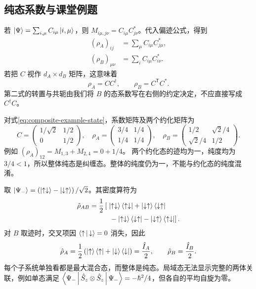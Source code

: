 \subsection{纯态系数与课堂例题}
若 $\Ket{\Psi}=\sum_{i,\mu}C_{i\mu}\Ket{i,\mu}$，则
$M_{i\mu,j\nu}=C_{i\mu}C_{j\nu}^*$。代入偏迹公式，得到
\begin{align}
\left(\rho_A\right)_{ij}&=\sum_\mu C_{i\mu}C_{j\mu}^*,\\
\left(\rho_B\right)_{\mu\nu}&=\sum_i C_{i\mu}C_{i\nu}^*.
\end{align}
若把 $C$ 视作 $d_A\times d_B$ 矩阵，这意味着
\begin{equation}
\rho_A=CC^\dagger,\qquad\rho_B=C^{\mathsf T}C^*.
\end{equation}
第二式的转置与共轭由我们将 $B$ 的态系数写在右侧的约定决定，不应直接写成 $C^\dagger C$。

\begin{example}[对整体纯态取偏迹]
对式\eqref{eq:composite-example-state}，系数矩阵及两个约化矩阵为
\begin{equation}
C=\left(\begin{matrix}1/\sqrt2&1/2\\0&1/2\end{matrix}\right),\quad
\rho_A=\left(\begin{matrix}3/4&1/4\\1/4&1/4\end{matrix}\right),\quad
\rho_B=\left(\begin{matrix}1/2&\sqrt2/4\\\sqrt2/4&1/2\end{matrix}\right).
\end{equation}
例如 $\left(\rho_A\right)_{12}=M_{1,3}+M_{2,4}=0+1/4$。
两个约化态的迹均为一，纯度均为 $3/4<1$，所以整体纯态是纠缠态。整体的纯度仍为一，不能与约化态的纯度混淆。
\end{example}

\begin{example}[自旋单态的约化态]
取 $\Ket{\Psi_-}=\left(\Ket{\uparrow\downarrow}-\Ket{\downarrow\uparrow}\right)/\sqrt2$。其密度算符为
\begin{align}
\hat\rho_{AB}=\frac12\left[\vphantom{\Ket{\uparrow\downarrow}}\right.&
\Ket{\uparrow\downarrow}\Bra{\uparrow\downarrow}
+\Ket{\downarrow\uparrow}\Bra{\downarrow\uparrow}\notag\\
&\left.{}-\Ket{\uparrow\downarrow}\Bra{\downarrow\uparrow}
-\Ket{\downarrow\uparrow}\Bra{\uparrow\downarrow}\right].
\end{align}
对 $B$ 取迹时，交叉项因 $\Braket{\uparrow|\downarrow}=0$ 消失，因此
\begin{equation}
\hat\rho_A=\frac12\left(\Ket{\uparrow}\Bra{\uparrow}+\Ket{\downarrow}\Bra{\downarrow}\right)=\frac{\hat I_A}{2},\qquad
\hat\rho_B=\frac{\hat I_B}{2}.
\end{equation}
每个子系统单独看都是最大混合态，而整体是纯态。局域态无法显示完整的两体关联，例如单态满足
$\Braket{\Psi_-|\hat S_z\otimes\hat S_z|\Psi_-}=-\hbar^2/4$，但各自的平均自旋为零。
\end{example}
